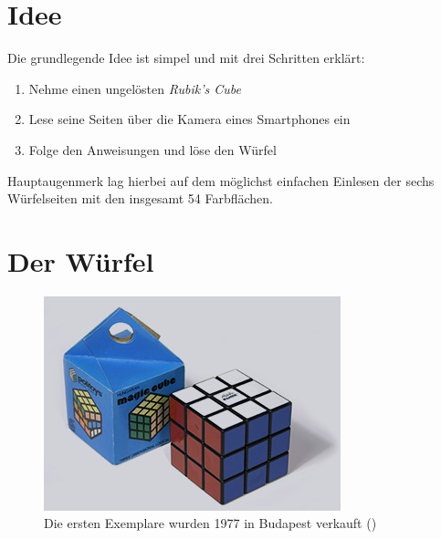 



\thispagestyle{empty}				%

\printtitle									%
  	\vfill
\printauthor								%
\newpage

\tableofcontents
\newpage

\section{Idee}  %
Die grundlegende Idee ist simpel und mit drei Schritten erklärt:

\begin{enumerate}

  \item Nehme einen ungelösten \emph{Rubik's Cube}

  \item Lese seine Seiten über die Kamera eines Smartphones ein

  \item Folge den Anweisungen und löse den Würfel

\end{enumerate}

Hauptaugenmerk lag hierbei auf dem möglichst einfachen Einlesen der sechs
Würfelseiten mit den insgesamt 54 Farbflächen.

\section{Der Würfel}  %

\begin{figure}[ht!]
  \centering
  \includegraphics[width=\textwidth]{pics/rubikcube1977.jpg}
  \caption{Die ersten Exemplare wurden 1977 in Budapest verkauft
  (\cite{rubik:history})}
  \label{fig:rubik1977}
\end{figure}


